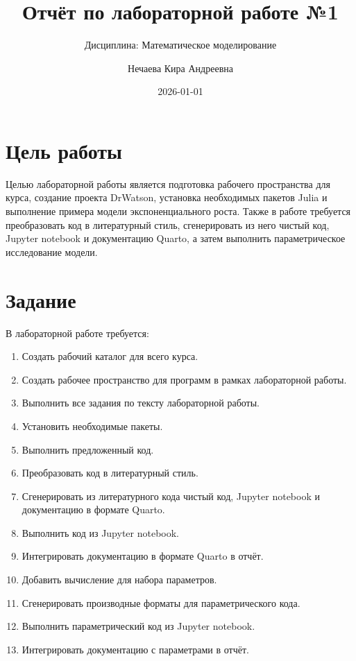 \documentclass[
  russian,
  12pt,
  a4paper,
  DIV=11,
  numbers=noendperiod]{scrreprt}
\title{Отчёт по лабораторной работе №1}
\subtitle{Дисциплина: Математическое моделирование}
\author{Нечаева Кира Андреевна}
\date{2026-01-01}
\providecommand{\tightlist}{%
  \setlength{\itemsep}{0pt}\setlength{\parskip}{0pt}}
\renewcommand*\contentsname{Содержание}
\newcommand\contentsname{Содержание}
\begin{document}
\maketitle

\renewcommand*\contentsname{Содержание}
{
\setcounter{tocdepth}{1}
\tableofcontents
}
\listoffigures
\listoftables

\chapter{Цель
работы}\label{ux446ux435ux43bux44c-ux440ux430ux431ux43eux442ux44b}

Целью лабораторной работы является подготовка рабочего пространства для
курса, создание проекта DrWatson, установка необходимых пакетов Julia и
выполнение примера модели экспоненциального роста. Также в работе
требуется преобразовать код в литературный стиль, сгенерировать из него
чистый код, Jupyter notebook и документацию Quarto, а затем выполнить
параметрическое исследование модели.

\chapter{Задание}\label{ux437ux430ux434ux430ux43dux438ux435}

В лабораторной работе требуется:

\begin{enumerate}
\def\labelenumi{\arabic{enumi}.}
\tightlist
\item
  Создать рабочий каталог для всего курса.
\item
  Создать рабочее пространство для программ в рамках лабораторной
  работы.
\item
  Выполнить все задания по тексту лабораторной работы.
\item
  Установить необходимые пакеты.
\item
  Выполнить предложенный код.
\item
  Преобразовать код в литературный стиль.
\item
  Сгенерировать из литературного кода чистый код, Jupyter notebook и
  документацию в формате Quarto.
\item
  Выполнить код из Jupyter notebook.
\item
  Интегрировать документацию в формате Quarto в отчёт.
\item
  Добавить вычисление для набора параметров.
\item
  Сгенерировать производные форматы для параметрического кода.
\item
  Выполнить параметрический код из Jupyter notebook.
\item
  Интегрировать документацию с параметрами в отчёт.
\end{enumerate}
\end{document}
